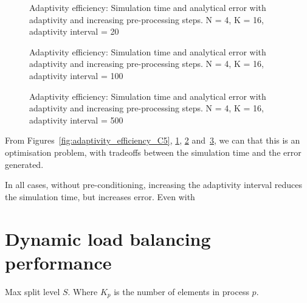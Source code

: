 \begin{figure}[H]
	\centering
	
	\caption{Adaptivity efficiency: Simulation time and analytical error with adaptivity and increasing pre-processing steps. N = 4, K = 16, adaptivity interval = 20}
	\label{fig:adaptivity_efficiency_C20}
\end{figure}

\begin{figure}[H]
	\centering
	
	\caption{Adaptivity efficiency: Simulation time and analytical error with adaptivity and increasing pre-processing steps. N = 4, K = 16, adaptivity interval = 100}
	\label{fig:adaptivity_efficiency_C100}
\end{figure}

\begin{figure}[H]
	\centering
	
	\caption{Adaptivity efficiency: Simulation time and analytical error with adaptivity and increasing pre-processing steps. N = 4, K = 16, adaptivity interval = 500}
	\label{fig:adaptivity_efficiency_C500}
\end{figure}

From Figures~\ref{fig:adaptivity_efficiency_C5}, \ref{fig:adaptivity_efficiency_C20},
\ref{fig:adaptivity_efficiency_C100} and~\ref{fig:adaptivity_efficiency_C500}, we can that this is
an optimisation problem, with tradeoffs between the simulation time and the error generated.

In all cases, without pre-conditioning, increasing the adaptivity interval reduces the simulation
time, but increases error. Even with 

\section{Dynamic load balancing performance} \label{section:results:load_balancing_performance}

Max split level $S$. Where $K_p$ is the number of elements in process $p$.

